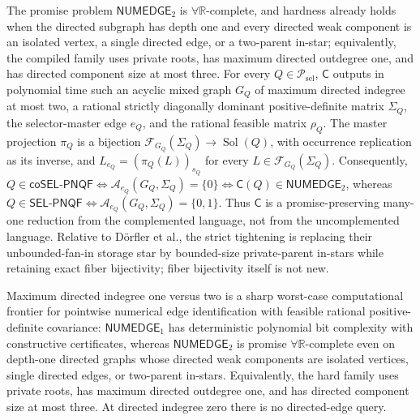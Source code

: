 The promise problem \(\mathsf{NUMEDGE}_2\) is \(\forall\mathbb R\)-complete, and hardness already holds when the directed subgraph has depth one and every directed weak component is an isolated vertex, a single directed edge, or a two-parent in-star; equivalently, the compiled family uses private roots, has maximum directed outdegree one, and has directed component size at most three.  For every \(Q\in\mathcal P_{\mathrm{sel}}\), \(\mathsf C\) outputs in polynomial time such an acyclic mixed graph \(G_Q\) of maximum directed indegree at most two, a rational strictly diagonally dominant positive-definite matrix \(\Sigma_Q\), the selector-master edge \(e_Q\), and the rational feasible matrix \(\rho_Q\).  The master projection \(\pi_Q\) is a bijection \(\mathcal F_{G_Q}(\Sigma_Q)\to\operatorname{Sol}(Q)\), with occurrence replication as its inverse, and \(L_{e_Q}=(\pi_Q(L))_{s_Q}\) for every \(L\in\mathcal F_{G_Q}(\Sigma_Q)\).  Consequently, \(Q\in\mathsf{coSEL\mbox{-}PNQF}\Longleftrightarrow\mathcal A_{e_Q}(G_Q,\Sigma_Q)=\{0\}\Longleftrightarrow\mathsf C(Q)\in\mathsf{NUMEDGE}_2\), whereas \(Q\in\mathsf{SEL\mbox{-}PNQF}\Longleftrightarrow\mathcal A_{e_Q}(G_Q,\Sigma_Q)=\{0,1\}\).  Thus \(\mathsf C\) is a promise-preserving many-one reduction from the complemented language, not from the uncomplemented language.  Relative to Dörfler et al., the strict tightening is replacing their unbounded-fan-in storage star by bounded-size private-parent in-stars while retaining exact fiber bijectivity; fiber bijectivity itself is not new.

Maximum directed indegree one versus two is a sharp worst-case computational frontier for pointwise numerical edge identification with feasible rational positive-definite covariance: \(\mathsf{NUMEDGE}_1\) has deterministic polynomial bit complexity with constructive certificates, whereas \(\mathsf{NUMEDGE}_2\) is promise \(\forall\mathbb R\)-complete even on depth-one directed graphs whose directed weak components are isolated vertices, single directed edges, or two-parent in-stars.  Equivalently, the hard family uses private roots, has maximum directed outdegree one, and has directed component size at most three.  At directed indegree zero there is no directed-edge query.

